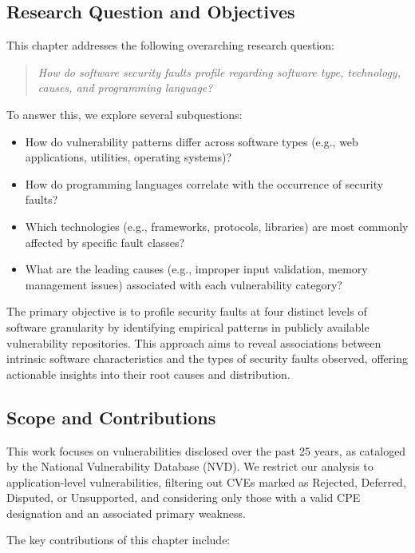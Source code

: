 \subsection{Research Question and Objectives}

This chapter addresses the following overarching research question:

\begin{quote}
\textit{How do software security faults profile regarding software type, technology, causes, and programming language?}
\end{quote}

To answer this, we explore several subquestions:

\begin{itemize}
    \item How do vulnerability patterns differ across software types (e.g., web applications, utilities, operating systems)?
    \item How do programming languages correlate with the occurrence of security faults?
    \item Which technologies (e.g., frameworks, protocols, libraries) are most commonly affected by specific fault classes?
    \item What are the leading causes (e.g., improper input validation, memory management issues) associated with each vulnerability category?
\end{itemize}

The primary objective is to profile security faults at four distinct levels of software granularity by identifying empirical patterns in publicly available vulnerability repositories. This approach aims to reveal associations between intrinsic software characteristics and the types of security faults observed, offering actionable insights into their root causes and distribution.

\subsection{Scope and Contributions}

This work focuses on vulnerabilities disclosed over the past 25 years, as cataloged by the National Vulnerability Database (NVD). We restrict our analysis to application-level vulnerabilities, filtering out \ac{CVE}s marked as Rejected, Deferred, Disputed, or Unsupported, and considering only those with a valid CPE designation and an associated primary weakness.

The key contributions of this chapter include:


